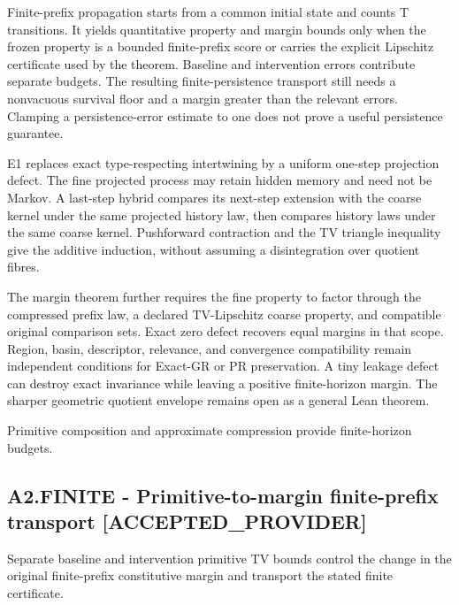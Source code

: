 \documentclass[11pt,a4paper]{article}
\newcommand{\companionEquation}[1]{\begin{center}\sbox{\companionEqBox}{$\displaystyle #1$}\ifdim\wd\companionEqBox>\linewidth\resizebox{\linewidth}{!}{\usebox{\companionEqBox}}\else\usebox{\companionEqBox}\fi\end{center}}
\begin{document}
Finite-prefix propagation starts from a common initial state and counts T transitions. It yields quantitative property and margin bounds only when the frozen property is a bounded finite-prefix score or carries the explicit Lipschitz certificate used by the theorem. Baseline and intervention errors contribute separate budgets. The resulting finite-persistence transport still needs a nonvacuous survival floor and a margin greater than the relevant errors. Clamping a persistence-error estimate to one does not prove a useful persistence guarantee.

E1 replaces exact type-respecting intertwining by a uniform one-step projection defect. The fine projected process may retain hidden memory and need not be Markov. A last-step hybrid compares its next-step extension with the coarse kernel under the same projected history law, then compares history laws under the same coarse kernel. Pushforward contraction and the TV triangle inequality give the additive induction, without assuming a disintegration over quotient fibres.

The margin theorem further requires the fine property to factor through the compressed prefix law, a declared TV-Lipschitz coarse property, and compatible original comparison sets. Exact zero defect recovers equal margins in that scope. Region, basin, descriptor, relevance, and convergence compatibility remain independent conditions for Exact-GR or PR preservation. A tiny leakage defect can destroy exact invariance while leaving a positive finite-horizon margin. The sharper geometric quotient envelope remains open as a general Lean theorem.

\companionEquation{\delta_K\leq \min(1,\delta_\alpha+\delta_P+\delta_U),\qquad {\rm TV}(q_{\ast}P^{0:T}_y,\overline{P}^{0:T}_{q(y)})\leq\min(1,T\eta).}
{\small Primitive composition and approximate compression provide finite-horizon budgets.}
\subsection*{A2.FINITE - Primitive-to-margin finite-prefix transport [ACCEPTED\_PROVIDER]}
Separate baseline and intervention primitive TV bounds control the change in the original finite-prefix constitutive margin and transport the stated finite certificate.
\end{document}
